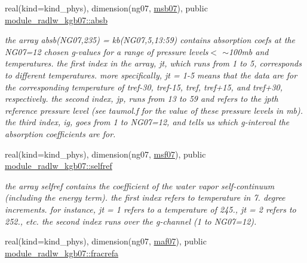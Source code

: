 \begin{DoxyCompactItemize}
\mbox{\label{group__module__radlw__kgbnn_gab0478438e9bbe64401aa492510f8d4bb}} 
real(kind=kind\+\_\+phys), dimension(ng07, \hyperlink{group__module__radlw__kgbnn_gabba2139dfc5d8551f844f3809c28ce3c}{msb07}), public \hyperlink{group__module__radlw__kgbnn_gab0478438e9bbe64401aa492510f8d4bb}{module\+\_\+radlw\+\_\+kgb07\+::absb}
\begin{DoxyCompactList}\small\item\em the array absb(\+N\+G07,235) = kb(\+N\+G07,5,13\+:59) contains absorption coefs at the N\+G07=12 chosen g-\/values for a range of pressure levels$<$ $\sim$100mb and temperatures. the first index in the array, jt, which runs from 1 to 5, corresponds to different temperatures. more specifically, jt = 1-\/5 means that the data are for the corresponding temperature of tref-\/30, tref-\/15, tref, tref+15, and tref+30, respectively. the second index, jp, runs from 13 to 59 and refers to the jpth reference pressure level (see taumol.\+f for the value of these pressure levels in mb). the third index, ig, goes from 1 to N\+G07=12, and tells us which g-\/interval the absorption coefficients are for. \end{DoxyCompactList}\item 
\mbox{\label{group__module__radlw__kgbnn_gaaf6d41f390a0465af92756b9c3e6c558}} 
real(kind=kind\+\_\+phys), dimension(ng07, \hyperlink{group__module__radlw__kgbnn_ga9310f33501467fbadcf092d71559358b}{msf07}), public \hyperlink{group__module__radlw__kgbnn_gaaf6d41f390a0465af92756b9c3e6c558}{module\+\_\+radlw\+\_\+kgb07\+::selfref}
\begin{DoxyCompactList}\small\item\em the array selfref contains the coefficient of the water vapor self-\/continuum (including the energy term). the first index refers to temperature in 7. degree increments. for instance, jt = 1 refers to a temperature of 245., jt = 2 refers to 252., etc. the second index runs over the g-\/channel (1 to N\+G07=12). \end{DoxyCompactList}\item 
\mbox{\label{group__module__radlw__kgbnn_ga07f2a4a0f1152a65aed68623f14a9ae4}} 
real(kind=kind\+\_\+phys), dimension(ng07, \hyperlink{group__module__radlw__kgbnn_ga21ac454fe21fb07ee555b4106121b2ae}{maf07}), public \hyperlink{group__module__radlw__kgbnn_ga07f2a4a0f1152a65aed68623f14a9ae4}{module\+\_\+radlw\+\_\+kgb07\+::fracrefa}

\end{DoxyCompactItemize}
